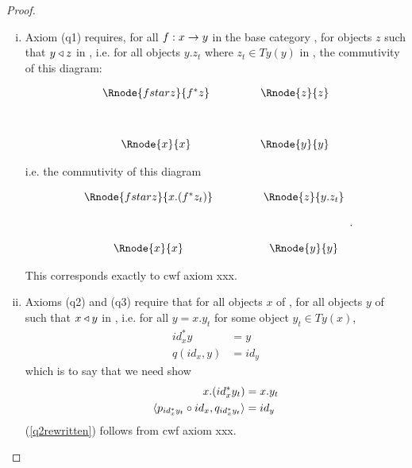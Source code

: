 \begin{proof}

\begin{enumerate}[(i)]
\item 
Axiom (q1) requires,  
for all $f: x \rightarrow y$ in the base category \catcw, for objects $z$ such that $y \triangleleft z$ in \catcw, i.e. for all objects $y.z_t$ where $z_t \in Ty(y)$ in \catcw
, the commutivity of this diagram:
\vspace{3mm}
\begin{center}
\begin{displaymath}
\begin{array}{cp{.9cm}c}
\Rnode{fstarz}{f^*z} & & \Rnode{z}{z}\\ [1.2cm]
\Rnode{x}{x}         & & \Rnode{y}{y}
\end{array}
\end{displaymath}
\end{center}
i.e. the commutivity of this diagram
\vspace{3mm}
\begin{center}
\begin{displaymath}
\begin{array}{cp{.9cm}c}
\Rnode{fstarz}{x.(f^*z_t)} & & \Rnode{z}{y.z_t}\\ [1.2cm]
\Rnode{x}{x}         & & \Rnode{y}{y}
\end{array}
.
\end{displaymath}
\end{center}

This corresponds exactly to cwf axiom xxx.

\item
Axioms (q2) and (q3) require that 
for all objects $x$ of \catcw, for all objects $y$ of \catcw such that $x \triangleleft y$ in , i.e. for all $y=x.y_t$ for some object
$y_t \in Ty(x)$, 
\begin{align}
id_x^*y   & =y \\
q(id_x,y) & = id_y
\end{align}
which is to say that we need show
\begin{align}
x.(id_x^*y_t)   & = x.y_t \label{q2rewritten}\\
\langle p_{id_x^*y_t} \circ id_x,q_{id_x^*y_t}\rangle & = id_y \label{q3rewritten}
\end{align}
(\ref{q2rewritten}) follows from cwf axiom xxx.


\end{enumerate}
\end{proof}

